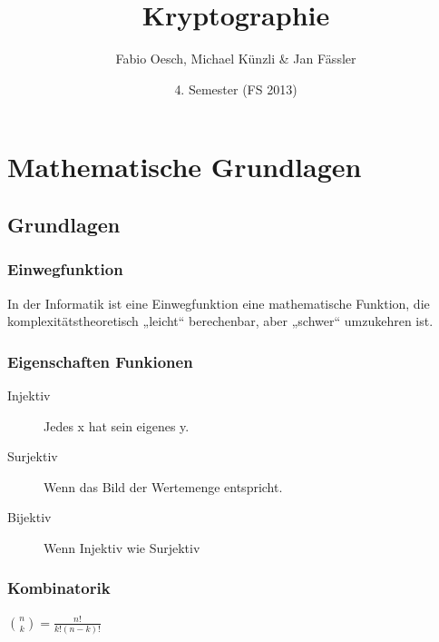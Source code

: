 \documentclass[landscape,twocolumn,a4paper]{article}
\title{
	\vspace{5cm}
	Kryptographie
}
\author{Fabio Oesch,  Michael Künzli \& Jan Fässler}
\date{4. Semester (FS 2013)}
\begin{document}
\section{Mathematische Grundlagen}
\subsection{Grundlagen}
\subsubsection{Einwegfunktion}
In der Informatik ist eine Einwegfunktion eine mathematische Funktion, die komplexitätstheoretisch „leicht“ berechenbar, aber „schwer“ umzukehren ist. 
\subsubsection{Eigenschaften Funkionen}
\begin{description}
\item [Injektiv] Jedes x hat sein eigenes y.
\item [Surjektiv] Wenn das Bild der Wertemenge entspricht.
\item [Bijektiv] Wenn Injektiv wie Surjektiv 
\end{description}
\subsubsection{Kombinatorik}
$\binom{n}{k} = \frac{n!}{k!(n-k)!}$
\end{document}
